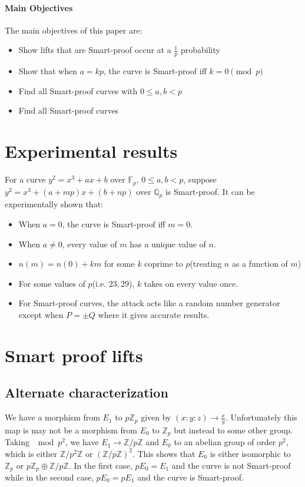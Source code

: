 \documentclass{article}
\newcommand{\mb}
{\mathbb}
\begin{document}
 \paragraph{Main Objectives} The main objectives of this paper are:

\begin{itemize}
    \item Show lifts that are Smart-proof occur at a $\frac1p$ probability
    \item Show that when $a=kp$, the curve is Smart-proof iff $k=0\pmod p$
    \item Find all Smart-proof curves with $0\leq a,b<p$
    \item Find all Smart-proof curves
\end{itemize}

\section{Experimental results}

For a curve $y^2=x^3+ax+b$ over $\mb F_p$, $0\leq a,b<p$, suppose $y^2=x^3+(a+mp)x+(b+np)$ over $\mb Q_p$ is Smart-proof. It can be experimentally shown that:

\begin{itemize}
    \item When $a=0$, the curve is Smart-proof iff $m=0$.
    \item When $a\neq0$, every value of $m$ has a unique value of $n$.
    \item $n(m)=n(0)+km$ for some $k$ coprime to $p$(treating $n$ as a function of $m$)
    \item For some values of $p$(i.e. $23,29$), $k$ takes on every value once.
    \item For Smart-proof curves, the attack acts like a random number generator except when $P=\pm Q$ where it gives accurate results.
\end{itemize}

\section{Smart proof lifts}

\subsection{Alternate characterization}

We have a morphism from $E_1$ to $p\mb Z_p$ given by $(x:y:z)\to\frac xy$. Unfortunately this map is may not be a morphism from $E_0$ to $\mb Z_p$ but instead to some other group. Taking $\mod p^2$, we have $E_1\to\mb Z/p\mb Z$ and $E_0$ to an abelian group of order $p^2$, which is either $\mb Z/p^2\mb Z$ or $\left(\mb Z/p\mb Z\right)^2$. This shows that $E_0$ is either isomorphic to $\mb Z_p$ or $p\mb Z_p\oplus\mb Z/p\mb Z$. In the first case, $pE_0=E_1$ and the curve is not Smart-proof while in the second case, $pE_0=pE_1$ and the curve is Smart-proof.
\end{document}

